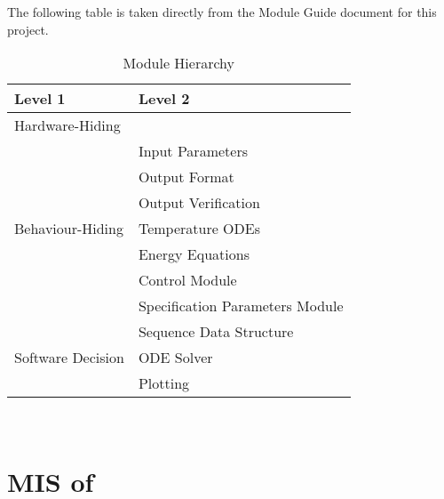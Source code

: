 \documentclass[12pt, titlepage]{article}
\begin{document}
The following table is taken directly from the Module Guide document for this project.

\begin{table}[h!]
  \centering
  \begin{tabular}{p{} p{}}
    \toprule
    \textbf{Level 1}                               & \textbf{Level 2}                \\
    \midrule

    {Hardware-Hiding}                              & ~                               \\
    \midrule

    \multirow{7}{0.3\textwidth}{Behaviour-Hiding}  & Input Parameters                \\
                                                   & Output Format                   \\
                                                   & Output Verification             \\
                                                   & Temperature ODEs                \\
                                                   & Energy Equations                \\
                                                   & Control Module                  \\
                                                   & Specification Parameters Module \\
    \midrule

    \multirow{3}{0.3\textwidth}{Software Decision} & {Sequence Data Structure}       \\
                                                   & ODE Solver                      \\
                                                   & Plotting                        \\
    \bottomrule
  \end{tabular}
  \caption{Module Hierarchy}
  \label{TblMH}
\end{table}

\newpage
~\newpage

\section{MIS of } \label{Module} 

\end{document}
